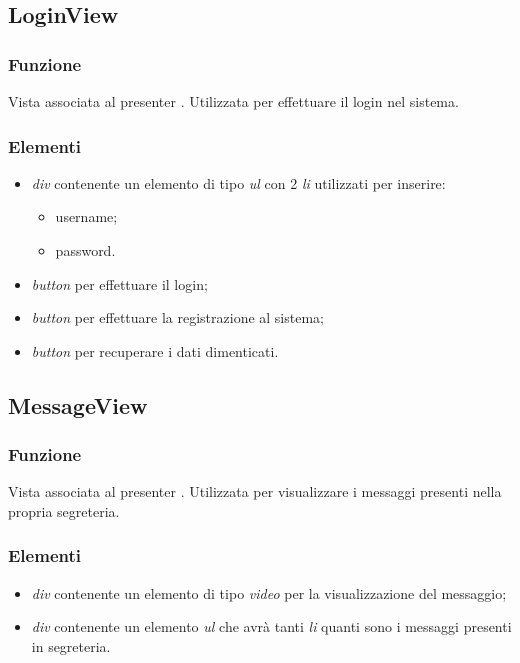 \subsection{LoginView}
\subsubsection*{Funzione}
Vista associata al presenter . Utilizzata per effettuare il login nel sistema.
\subsubsection*{Elementi}
\begin{itemize}
\item \textit{div} contenente un elemento di tipo \textit{ul} con 2 \textit{li} utilizzati per inserire:
\begin{itemize}
\item username;
\item password.
\end{itemize}
\item \textit{button} per effettuare il login;
\item \textit{button} per effettuare la registrazione al sistema;
\item \textit{button} per recuperare i dati dimenticati.
\end{itemize}

\subsection{MessageView}
\subsubsection*{Funzione}
Vista associata al presenter . Utilizzata per visualizzare i messaggi presenti nella propria segreteria.
\subsubsection*{Elementi}
\begin{itemize}
\item \textit{div} contenente un elemento di tipo \textit{video} per la visualizzazione del messaggio;
\item \textit{div} contenente un elemento \textit{ul} che avrà tanti \textit{li} quanti sono i messaggi presenti in segreteria.
\end{itemize}


